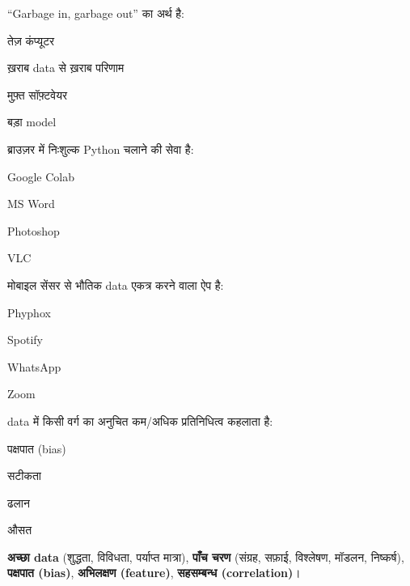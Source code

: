 \begin{mcq}
  \item “Garbage in, garbage out” का अर्थ है:
    \begin{choices}\item तेज़ कंप्यूटर \item ख़राब data से ख़राब परिणाम
      \item मुफ़्त सॉफ़्टवेयर \item बड़ा model\end{choices}
  \item ब्राउज़र में निःशुल्क Python चलाने की सेवा है:
    \begin{choices}\item Google Colab \item MS Word \item Photoshop \item VLC\end{choices}
  \item मोबाइल सेंसर से भौतिक data एकत्र करने वाला ऐप है:
    \begin{choices}\item Phyphox \item Spotify \item WhatsApp \item Zoom\end{choices}
  \item data में किसी वर्ग का अनुचित कम/अधिक प्रतिनिधित्व कहलाता है:
    \begin{choices}\item पक्षपात (bias) \item सटीकता \item ढलान \item औसत\end{choices}
\end{mcq}

\begin{mukhyashabd}
\textbf{अच्छा data} (शुद्धता, विविधता, पर्याप्त मात्रा),
\textbf{पाँच चरण} (संग्रह, सफ़ाई, विश्लेषण, मॉडलन, निष्कर्ष),
\textbf{पक्षपात (bias)}, \textbf{अभिलक्षण (feature)}, \textbf{सहसम्बन्ध (correlation)}।
\end{mukhyashabd}
